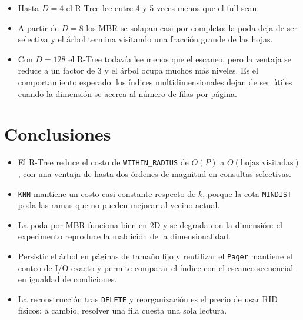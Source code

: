 \documentclass[11pt,a4paper]{article}
\newcommand{\code}[1]{\texttt{#1}}
\begin{document}
\begin{itemize}
  \item Hasta \(D=4\) el R-Tree lee entre 4 y 5 veces menos que el full scan.
  \item A partir de \(D=8\) los MBR se solapan casi por completo: la poda deja
        de ser selectiva y el árbol termina visitando una fracción grande de las
        hojas.
  \item Con \(D=128\) el R-Tree todavía lee menos que el escaneo, pero la ventaja
        se reduce a un factor de 3 y el árbol ocupa muchos más niveles. Es el
        comportamiento esperado: los índices multidimensionales dejan de ser
        útiles cuando la dimensión se acerca al número de filas por página.
\end{itemize}

\section{Conclusiones}

\begin{itemize}
  \item El R-Tree reduce el costo de \code{WITHIN\_RADIUS} de \(O(P)\) a
        \(O(\text{hojas visitadas})\), con una ventaja de hasta dos órdenes de
        magnitud en consultas selectivas.
  \item \code{KNN} mantiene un costo casi constante respecto de \(k\), porque la
        cota \code{MINDIST} poda las ramas que no pueden mejorar al vecino actual.
  \item La poda por MBR funciona bien en 2D y se degrada con la dimensión: el
        experimento reproduce la maldición de la dimensionalidad.
  \item Persistir el árbol en páginas de tamaño fijo y reutilizar el
        \code{Pager} mantiene el conteo de I/O exacto y permite comparar el
        índice con el escaneo secuencial en igualdad de condiciones.
  \item La reconstrucción tras \code{DELETE} y reorganización es el precio de
        usar RID físicos; a cambio, resolver una fila cuesta una sola lectura.
\end{itemize}
\end{document}
